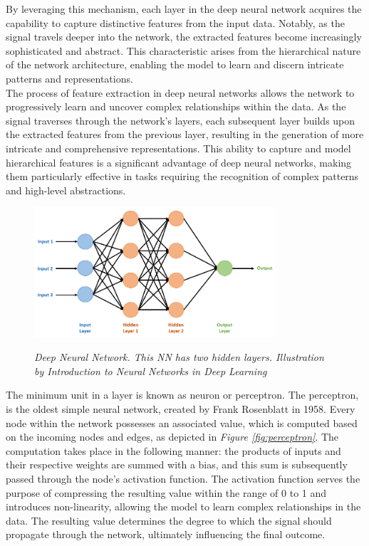 By leveraging this mechanism, each layer in the deep neural network acquires the capability to capture distinctive features from the input data. Notably, as the signal travels deeper into the network, the extracted features become increasingly sophisticated and abstract. This characteristic arises from the hierarchical nature of the network architecture, enabling the model to learn and discern intricate patterns and representations. \\

The process of feature extraction in deep neural networks allows the network to progressively learn and uncover complex relationships within the data. As the signal traverses through the network's layers, each subsequent layer builds upon the extracted features from the previous layer, resulting in the generation of more intricate and comprehensive representations. This ability to capture and model hierarchical features is a significant advantage of deep neural networks, making them particularly effective in tasks requiring the recognition of complex patterns and high-level abstractions.

\begin{figure}[H]
\centering
\includegraphics[width=0.8\textwidth]{imatges/preliminaries/deep-neural-network.png}
\caption[Deep Neural Network]{\textit{Deep Neural Network. This NN has two hidden layers. Illustration by Introduction to Neural Networks in Deep Learning}}
{\label{fig:deep-nn}}
\end{figure}

The minimum unit in a layer is known as neuron or perceptron. 
The perceptron, is the oldest simple neural network, created by Frank Rosenblatt in 1958. 
Every node within the network possesses an associated value, which is computed based on the incoming nodes and edges, 
as depicted in \textit{Figure \ref{fig:perceptron}}. The computation takes place in the following manner: the products 
of  inputs and their respective weights are summed with a bias, and this sum is subsequently passed through the node's activation function. 
The activation function serves the purpose of compressing the resulting value within the range of 0 to 1 and introduces non-linearity, 
allowing the model to learn complex relationships in the data. The resulting value determines the 
degree to which the signal should propagate through the network, ultimately influencing the final outcome.

